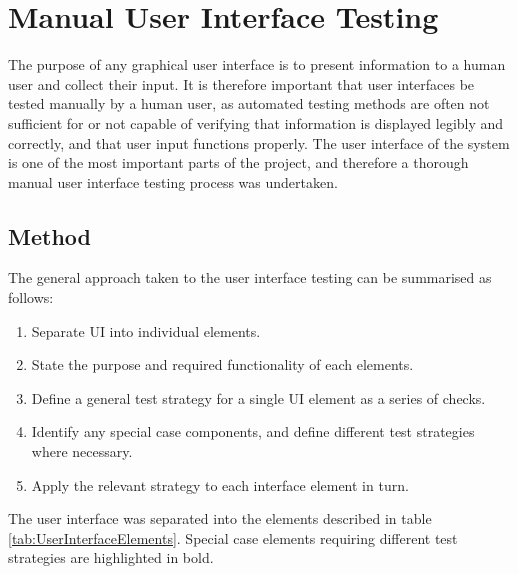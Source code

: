 \section{Manual User Interface Testing} \label{ManualUserInterfaceTesting}
The purpose of any graphical user interface is to present information to a human user and collect their input. It is therefore important that user interfaces be tested manually by a human user, as automated testing methods are often not sufficient for or not capable of verifying that information is displayed legibly and correctly, and that user input functions properly. The user interface of the system is one of the most important parts of the project, and therefore a thorough manual user interface testing process was undertaken.

\subsection{Method}
The general approach taken to the user interface testing can be summarised as follows:

\begin{enumerate}
 \item Separate UI into individual elements.
 \item State the purpose and required functionality of each elements.
 \item Define a general test strategy for a single UI element as a series of checks.
 \item Identify any special case components, and define different test strategies where necessary.
 \item Apply the relevant strategy to each interface element in turn.
\end{enumerate}

\vspace{0.5cm}

The user interface was separated into the elements described in table \ref{tab:UserInterfaceElements}. Special case elements requiring different test strategies are highlighted in bold.

